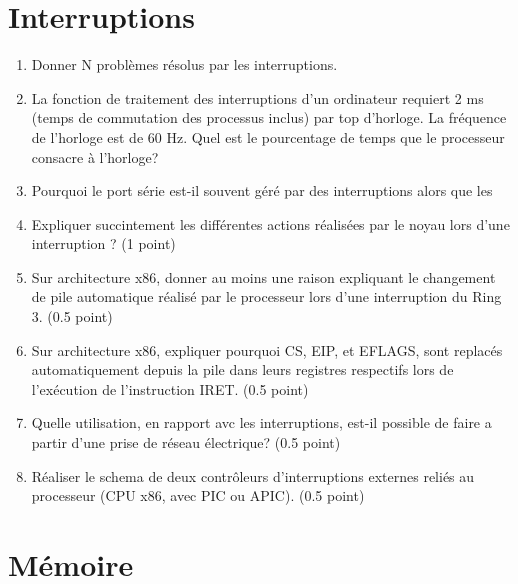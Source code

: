 \section{{Interruptions}
         {\hfill{} }}
\begin{enumerate}
  \item Donner N problèmes résolus par les interruptions.

  \item La fonction de traitement des interruptions d'un ordinateur requiert 2 ms (temps de commutation des processus inclus) par top d'horloge. La fréquence de l'horloge est de 60 Hz. Quel est le pourcentage de temps que le processeur consacre à l'horloge?

  \item Pourquoi le port série est-il souvent géré par des interruptions alors que les

  \item Expliquer succintement les différentes actions réalisées par le noyau lors d'une interruption ? (1 point)
  \item Sur architecture x86, donner au moins une raison expliquant le changement de pile automatique réalisé par le processeur lors d'une interruption du Ring 3. (0.5 point)
  \item Sur architecture x86, expliquer pourquoi CS, EIP, et EFLAGS, sont replacés automatiquement depuis la pile dans leurs registres respectifs lors de l'exécution de l'instruction IRET. (0.5 point)
  \item Quelle utilisation, en rapport avc les interruptions, est-il possible de faire a partir d'une prise de réseau électrique? (0.5 point)
  \item Réaliser le schema de deux contrôleurs d'interruptions externes reliés au processeur (CPU x86, avec PIC ou APIC). (0.5 point)
\end{enumerate}

\section{{Mémoire}
         {\hfill{} }}

